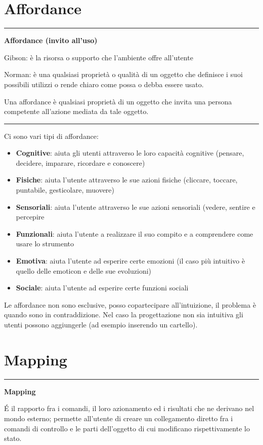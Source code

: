 \documentclass[11pt,a4paper]{book}
\begin{document}
\section{Affordance} \label{par: affordance}
\noindent\rule{\textwidth}{1pt}
\begin{center}
	\textbf{Affordance (invito all’uso)}
\end{center}
Gibson: è la risorsa o supporto che l'ambiente offre all'utente

Norman: è una qualsiasi proprietà o qualità di un oggetto che definisce i suoi possibili utilizzi o rende chiaro come possa o debba essere usato.

Una affordance è qualsiasi proprietà di un oggetto che invita una persona competente all'azione mediata da tale oggetto.

\noindent\rule{\textwidth}{1pt}

Ci sono vari tipi di affordance:
\begin{itemize}
	\item \textbf{Cognitive}: aiuta gli utenti attraverso le loro capacità cognitive (pensare, decidere, imparare, ricordare e conoscere)
	\item \textbf{Fisiche}: aiuta l'utente attraverso le sue azioni fisiche (cliccare, toccare, puntabile, gesticolare, muovere)
	\item \textbf{Sensoriali}: aiuta l'utente attraverso le sue azioni sensoriali (vedere, sentire e percepire
	\item \textbf{Funzionali}: aiuta l'utente a realizzare il suo compito e a comprendere come usare lo strumento
	\item \textbf{Emotiva}: aiuta l'utente ad esperire certe emozioni (il caso più intuitivo è quello delle emoticon e delle sue evoluzioni) 
	\item \textbf{Sociale}: aiuta l'utente ad esperire certe funzioni sociali
\end{itemize}

Le affordance non sono esclusive, posso copartecipare all'intuizione, il problema è quando sono in contraddizione. Nel caso la progettazione non sia intuitiva gli utenti possono aggiungerle (ad esempio inserendo un cartello).

\section{Mapping} \label{par: mapping}
\noindent\rule{\textwidth}{1pt}
\begin{center}
	\textbf{Mapping}
\end{center}	
É il rapporto fra i comandi, il loro azionamento ed i risultati che ne derivano nel mondo esterno; permette all’utente di creare un collegamento diretto fra i comandi di controllo e le parti dell’oggetto di cui modificano rispettivamente lo stato.
\end{document}
